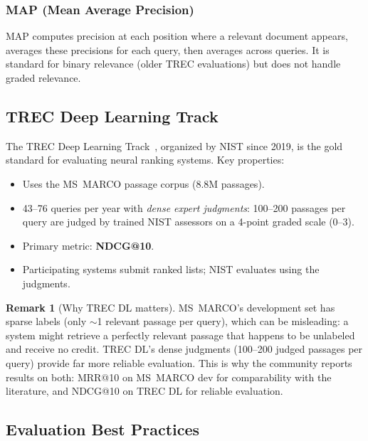 \documentclass[11pt,a4paper]{article}
\theoremstyle{definition}
\newtheorem{remark}{Remark}[section]
\theoremstyle{plain}
\begin{document}
\subsubsection{MAP (Mean Average Precision)}

MAP computes precision at each position where a relevant document appears, averages these precisions for each query, then averages across queries. It is standard for binary relevance (older TREC evaluations) but does not handle graded relevance.

\subsection{TREC Deep Learning Track}

The TREC Deep Learning Track~\cite{craswell2020overview}, organized by NIST since 2019, is the gold standard for evaluating neural ranking systems. Key properties:

\begin{itemize}
    \item Uses the MS~MARCO passage corpus (8.8M passages).
    \item 43--76 queries per year with \emph{dense expert judgments}: 100--200 passages per query are judged by trained NIST assessors on a 4-point graded scale (0--3).
    \item Primary metric: \textbf{NDCG@10}.
    \item Participating systems submit ranked lists; NIST evaluates using the judgments.
\end{itemize}

\begin{remark}[Why TREC DL matters]
MS~MARCO's development set has sparse labels (only $\sim$1 relevant passage per query), which can be misleading: a system might retrieve a perfectly relevant passage that happens to be unlabeled and receive no credit. TREC DL's dense judgments (100--200 judged passages per query) provide far more reliable evaluation. This is why the community reports results on both: MRR@10 on MS~MARCO dev for comparability with the literature, and NDCG@10 on TREC DL for reliable evaluation.
\end{remark}

\subsection{Evaluation Best Practices}
\end{document}
